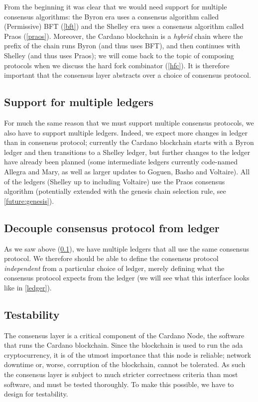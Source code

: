 From the beginning it was clear that we would need support for multiple
consensus algorithms: the Byron era uses a consensus algorithm called
(Permissive) BFT (\cref{bft}) and the Shelley era uses a consensus algorithm
called Praos (\cref{praos}). Moreover, the Cardano blockchain is a \emph{hybrid}
chain where the prefix of the chain runs Byron (and thus uses BFT), and then
continues with Shelley (and thus uses Praos); we will come back to the topic of
composing protocols when we discuss the hard fork combinator (\cref{hfc}). It is
therefore important that the consensus layer abstracts over a choice of
consensus protocol.

\subsection{Support for multiple ledgers}
\label{multiple-ledgers}

For much the same reason that we must support multiple consensus protocols, we
also have to support multiple ledgers. Indeed, we expect more changes in ledger
than in consensus protocol; currently the Cardano blockchain starts with a
Byron ledger and then transitions to a Shelley ledger, but further changes to
the ledger have already been planned (some intermediate ledgers currently
code-named Allegra and Mary, as well as larger updates to Goguen, Basho and
Voltaire). All of the ledgers (Shelley up to including Voltaire)
use the Praos consensus algorithm (potentially extended with the genesis chain
selection rule, see \cref{future:genesis}).

\subsection{Decouple consensus protocol from ledger}
\label{decouple-consensus-ledger}

As we saw above (\cref{multiple-ledgers}), we have multiple ledgers that all
use the same consensus protocol. We therefore should be able to define the
consensus protocol \emph{independent} from a particular choice of ledger,
merely defining what the consensus protocol expects from the ledger
(we will see what this interface looks like in \cref{ledger}).

\subsection{Testability}
\label{testability}

The consensus layer is a critical component of the Cardano Node, the software
that runs the Cardano blockchain. Since the blockchain is used to run the ada
cryptocurrency, it is of the utmost importance that this node is reliable;
network downtime or, worse, corruption of the blockchain, cannot be tolerated.
As such the consensus layer is subject to much stricter correctness criteria
than most software, and must be tested thoroughly. To make this possible, we
have to design for testability.

